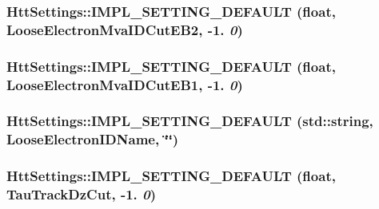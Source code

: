 \label{classHttSettings_a7472951724a2910def335470c152d36d}
\hypertarget{classHttSettings_a360ed92849bfcca6dfcbf06f2915b706}{
\subsubsection[{IMPL\_\-SETTING\_\-DEFAULT}]{\setlength{\rightskip}{0pt plus 5cm}HttSettings::IMPL\_\-SETTING\_\-DEFAULT (float, \/  LooseElectronMvaIDCutEB2, \/  -\/1. {\em 0})}}
\label{classHttSettings_a360ed92849bfcca6dfcbf06f2915b706}
\hypertarget{classHttSettings_aa9f8c4a76b619e9b9ef1377f4070e8c1}{
\subsubsection[{IMPL\_\-SETTING\_\-DEFAULT}]{\setlength{\rightskip}{0pt plus 5cm}HttSettings::IMPL\_\-SETTING\_\-DEFAULT (float, \/  LooseElectronMvaIDCutEB1, \/  -\/1. {\em 0})}}
\label{classHttSettings_aa9f8c4a76b619e9b9ef1377f4070e8c1}
\hypertarget{classHttSettings_abc7136adbfcc43f9f1c3ec25c55dfa05}{
\subsubsection[{IMPL\_\-SETTING\_\-DEFAULT}]{\setlength{\rightskip}{0pt plus 5cm}HttSettings::IMPL\_\-SETTING\_\-DEFAULT (std::string, \/  LooseElectronIDName, \/  \char`\"{}\char`\"{})}}
\label{classHttSettings_abc7136adbfcc43f9f1c3ec25c55dfa05}
\hypertarget{classHttSettings_a9bf4264eeee3192afdd65acdb6806ef4}{
\subsubsection[{IMPL\_\-SETTING\_\-DEFAULT}]{\setlength{\rightskip}{0pt plus 5cm}HttSettings::IMPL\_\-SETTING\_\-DEFAULT (float, \/  TauTrackDzCut, \/  -\/1. {\em 0})}}
\label{classHttSettings_a9bf4264eeee3192afdd65acdb6806ef4}
